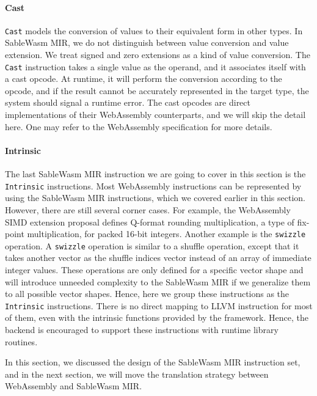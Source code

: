 \paragraph{Cast}
\texttt{Cast} models the conversion of values to their equivalent form in other
types. In SableWasm MIR, we do not distinguish between value conversion and
value extension. We treat signed and zero extensions as a kind of value
conversion. The \texttt{Cast} instruction takes a single value as the operand,
and it associates itself with a cast opcode. At runtime, it will perform the
conversion according to the opcode, and if the result cannot be accurately
represented in the target type, the system should signal a runtime error.
The cast opcodes are direct implementations of their WebAssembly counterparts,
and we will skip the detail here. One may refer to the WebAssembly specification
for more details.

\paragraph{Intrinsic}
The last SableWasm MIR instruction we are going to cover in this section is the
\texttt{Intrinsic} instructions. Most WebAssembly instructions can be
represented by using the SableWasm MIR instructions, which we covered earlier in
this section. However, there are still several corner cases. For example, the
WebAssembly SIMD extension proposal defines Q-format rounding multiplication, a
type of fix-point multiplication, for packed 16-bit integers. Another example is
the \texttt{swizzle} operation. A \texttt{swizzle} operation is similar to a
shuffle operation, except that it takes another vector as the shuffle indices
vector instead of an array of immediate integer values. These operations are
only defined for a specific vector shape and will introduce unneeded complexity
to the SableWasm MIR if we generalize them to all possible vector shapes. Hence,
here we group these instructions as the \texttt{Intrinsic} instructions. There
is no direct mapping to LLVM instruction for most of them, even with the
intrinsic functions provided by the framework. Hence, the backend is encouraged
to support these instructions with runtime library routines.

In this section, we discussed the design of the SableWasm MIR instruction set,
and in the next section, we will move the translation strategy between
WebAssembly and SableWasm MIR.